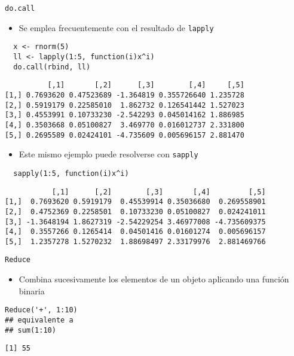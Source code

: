 \documentclass[xcolor={usenames,svgnames,dvipsnames}]{beamer}
\begin{document}
\begin{frame}[fragile,label={sec:orgheadline29}]{\texttt{do.call}}
 \begin{itemize}
\item Se emplea frecuentemente con el resultado de \texttt{lapply}
\end{itemize}
\lstset{language=R,label= ,caption= ,captionpos=b,numbers=none}
\begin{lstlisting}
  x <- rnorm(5)
  ll <- lapply(1:5, function(i)x^i)
  do.call(rbind, ll)
\end{lstlisting}

\begin{verbatim}
          [,1]       [,2]      [,3]        [,4]     [,5]
[1,] 0.7693620 0.47523689 -1.364819 0.355726640 1.235728
[2,] 0.5919179 0.22585010  1.862732 0.126541442 1.527023
[3,] 0.4553991 0.10733230 -2.542293 0.045014162 1.886985
[4,] 0.3503668 0.05100827  3.469770 0.016012737 2.331800
[5,] 0.2695589 0.02424101 -4.735609 0.005696157 2.881470
\end{verbatim}

\begin{itemize}
\item Este mismo ejemplo puede resolverse con \texttt{sapply}
\end{itemize}
\lstset{language=R,label= ,caption= ,captionpos=b,numbers=none}
\begin{lstlisting}
  sapply(1:5, function(i)x^i)
\end{lstlisting}

\begin{verbatim}
           [,1]      [,2]        [,3]       [,4]         [,5]
[1,]  0.7693620 0.5919179  0.45539914 0.35036680  0.269558901
[2,]  0.4752369 0.2258501  0.10733230 0.05100827  0.024241011
[3,] -1.3648194 1.8627319 -2.54229254 3.46977008 -4.735609375
[4,]  0.3557266 0.1265414  0.04501416 0.01601274  0.005696157
[5,]  1.2357278 1.5270232  1.88698497 2.33179976  2.881469766
\end{verbatim}
\end{frame}

\begin{frame}[fragile,label={sec:orgheadline30}]{\texttt{Reduce}}
 \begin{itemize}
\item Combina sucesivamente los elementos de un objeto aplicando una
función binaria
\end{itemize}
\lstset{language=R,label= ,caption= ,captionpos=b,numbers=none}
\begin{lstlisting}
Reduce('+', 1:10)
## equivalente a 
## sum(1:10)
\end{lstlisting}

\begin{verbatim}
[1] 55
\end{verbatim}
\end{frame}
\end{document}
